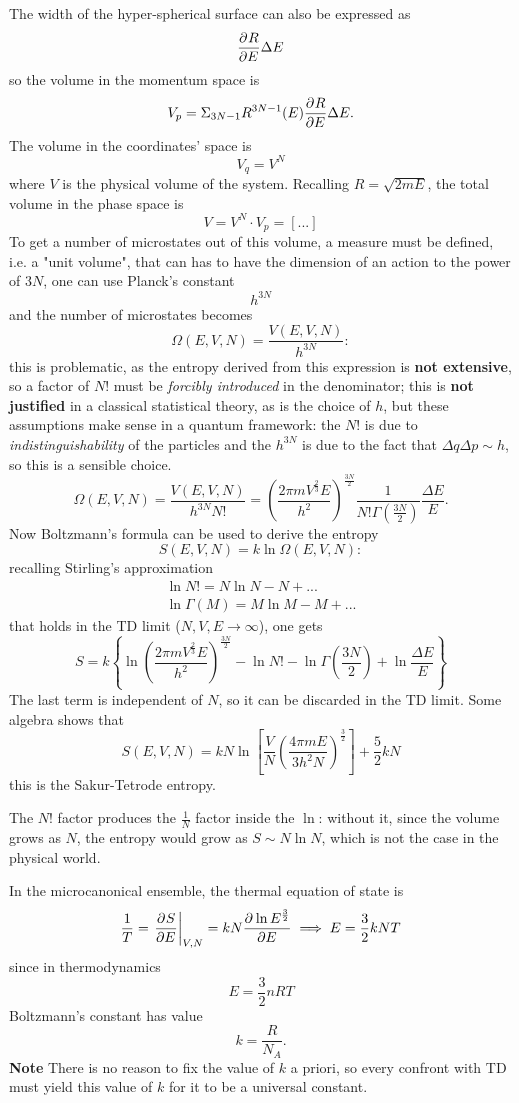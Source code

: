 
The width of the hyper-spherical surface can also be expressed as
$$\pdv[]{R}{E}\Delta E$$
so the volume in the momentum space is
$$V_p = \Sigma_{3N-1}R^{3N-1}(E)\pdv[]{R}{E}\Delta E.$$
The volume in the coordinates' space is
$$V_q = V^N$$
where $V$ is the physical volume of the system. Recalling $R = \sqrt{2mE}$, the
total volume in the phase space is
$$V = V^N\cdot V_p=[...]$$
To get a number of microstates out of this volume, a measure must be defined,
i.e. a "unit volume", that can has to have the dimension of an action to the
power of $3N$, one can use Planck's constant 
$$h^{3N}$$
and the number of microstates becomes
$$\Omega(E,V,N) = \frac{V(E,V,N)}{h^{3N}}:$$
this is problematic, as the entropy derived from this expression is \textbf{not
extensive}, so a factor of $N!$ must be \textit{forcibly introduced} in the
denominator; this is \textbf{not justified} in a classical statistical theory,
as is the choice of $h$, but these assumptions make sense in a quantum framework:
the $N!$ is due to \textit{indistinguishability} of the particles and the
$h^{3N}$ is due to the fact that $\Delta q\Delta p \sim h$, so this is a sensible
choice.
$$\Omega(E,V,N) = \frac{V(E,V,N)}{h^{3N}N!} =
\left(\frac{2\pi m V^{\frac{2}{3}}E}{h^2}\right)^{\frac{3N}{2}}\frac{1}{N!
\Gamma\left(\frac{3N}{2}\right)}\frac{\Delta E}{E}.$$
Now Boltzmann's formula can be used to derive the entropy
$$S(E,V,N) = k\ln\Omega(E,V,N):$$
recalling Stirling's approximation
\begin{gather*}
\ln N! = N\ln N - N+...\\
\ln \Gamma(M) = M\ln M - M +...
\end{gather*}
that holds in the TD limit ($N,V,E\to\infty$), one gets
$$S = k\left\{\ln\left(\frac{2\pi m V^{\frac{2}{3}}E}{h^2}\right)^{\frac{3N}{2}}
-\ln N! -\ln\Gamma\left(\frac{3N}{2}\right) + \ln \frac{\Delta E}{E }
\right\}$$
The last term is independent of $N$, so it can be discarded in the TD limit.
Some algebra shows that
$$S(E,V,N) = kN\ln\left[\frac{V}{N}\left(\frac{4\pi mE}{3h^2N}\right)^\frac{3}{2}
\right]+\frac{5}{2}kN$$
this is the Sakur-Tetrode entropy.

The $N!$ factor produces the $\frac{1}{N}$ factor inside the $\ln$: without it,
since the volume grows as $N$, the entropy would grow as $S\sim N\ln N$, which is
not the case in the physical world.

In the microcanonical ensemble, the thermal equation of state is
$$\frac{1}{T} = \eval{\pdv[]{S}{E}}_{V,N} = kN \pdv[]{\ln E^\frac{3}{2}}{E}
\implies E=\frac{3}{2}kNT$$
since in thermodynamics
$$E = \frac{3}{2}nRT$$
Boltzmann's constant has value
$$k = \frac{R}{N_A}.$$
\textbf{Note} There is no reason to fix the value of $k$ a priori, so every
confront with TD must yield this value of $k$ for it to be a universal constant.

